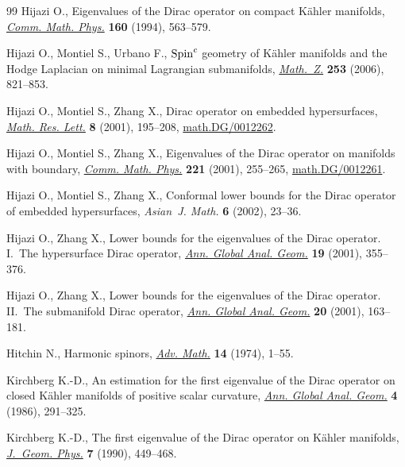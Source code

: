 \documentclass[pdftex]{sigma}
\numberwithin{equation}{section}
\theoremstyle{definition}
\begin{document}
\begin{thebibliography}{99}
Hijazi O., Eigenvalues of the {D}irac operator on compact {K}\"ahler manifolds,
  \href{http://dx.doi.org/10.1007/BF02173430}{\textit{Comm. Math. Phys.}} \textbf{160} (1994), 563--579.

Hijazi O., Montiel S., Urbano F., {${\rm Spin}^c$} geometry of {K}\"ahler
  manifolds and the {H}odge {L}aplacian on minimal {L}agrangian submanifolds,
  \href{http://dx.doi.org/10.1007/s00209-006-0936-8}{\textit{Math.~Z.}} \textbf{253} (2006), 821--853.

Hijazi O., Montiel S., Zhang X., Dirac operator on embedded hypersurfaces,
  \href{http://dx.doi.org/10.4310/MRL.2001.v8.n2.a8}{\textit{Math. Res. Lett.}} \textbf{8} (2001), 195--208,
  \href{http://arxiv.org/abs/math.DG/0012262}{math.DG/0012262}.

Hijazi O., Montiel S., Zhang X., Eigenvalues of the {D}irac operator on
  manifolds with boundary, \href{http://dx.doi.org/10.1007/s002200100475}{\textit{Comm. Math. Phys.}} \textbf{221} (2001),
  255--265, \href{http://arxiv.org/abs/math.DG/0012261}{math.DG/0012261}.

Hijazi O., Montiel S., Zhang X., Conformal lower bounds for the {D}irac
  operator of embedded hypersurfaces, \textit{Asian~J. Math.} \textbf{6}
  (2002), 23--36.

Hijazi O., Zhang X., Lower bounds for the eigenvalues of the {D}irac operator.
  {I}.~{T}he hypersurface {D}irac operator, \href{http://dx.doi.org/10.1023/A:1010749808691}{\textit{Ann. Global Anal. Geom.}}
  \textbf{19} (2001), 355--376.

Hijazi O., Zhang X., Lower bounds for the eigenvalues of the {D}irac operator.
  {II}.~{T}he submanifold {D}irac operator, \href{http://dx.doi.org/10.1023/A:1011663603699}{\textit{Ann. Global Anal. Geom.}}
  \textbf{20} (2001), 163--181.

Hitchin N., Harmonic spinors, \href{http://dx.doi.org/10.1016/0001-8708(74)90021-8}{\textit{Adv. Math.}} \textbf{14} (1974), 1--55.

Kirchberg K.-D., An estimation for the f\/irst eigenvalue of the {D}irac operator
  on closed {K}\"ahler manifolds of positive scalar curvature, \href{http://dx.doi.org/10.1007/BF00128050}{\textit{Ann.
  Global Anal. Geom.}} \textbf{4} (1986), 291--325.

Kirchberg K.-D., The f\/irst eigenvalue of the {D}irac operator on {K}\"ahler
  manifolds, \href{http://dx.doi.org/10.1016/0393-0440(90)90001-J}{\textit{J.~Geom. Phys.}} \textbf{7} (1990), 449--468.


\end{thebibliography}
\end{document}
